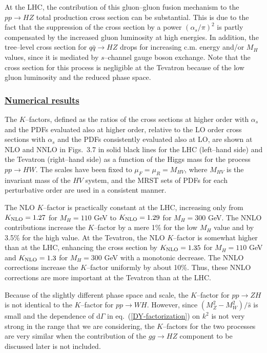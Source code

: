 At the LHC, the contribution of this  gluon--gluon fusion mechanism to the $pp
\to HZ$ total production cross section can be substantial. This is due to the
fact that the suppression of the cross section  by a power $(\alpha_s/\pi)^2$
is partly compensated by the increased gluon luminosity  at high energies. In
addition, the tree--level cross section for $q\bar{q} \to HZ$  drops for
increasing c.m. energy and/or $M_H$ values, since it is mediated by
$s$--channel gauge boson exchange. Note that the cross section for this process 
is negligible at the Tevatron because of the low gluon luminosity and the 
reduced phase space. 

\subsubsection*{\underline{Numerical results}}

The $K$--factors, defined as the ratios of the cross sections at higher order
with $\alpha_s$ and the PDFs evaluated also at higher order, relative to the LO
order cross sections with  $\alpha_s$ and the PDFs consistently evaluated also
at LO,  are shown at NLO and NNLO in Figs.~3.7 in solid black lines for 
the LHC (left--hand side) and the Tevatron (right--hand side) as a function of 
the Higgs  mass for the process $pp \to HW$.  The scales have been fixed to
$\mu_F=\mu_R=M_{HV}$, where $M_{HV}$ is the invariant mass of the $HV$ system,  
and the MRST sets of PDFs for each perturbative order are used in a consistent 
manner. \s

The NLO $K$--factor is practically constant at the LHC, increasing only from
$K_{\rm NLO}=1.27$ for $M_H=110$ GeV to $K_{\rm NLO}=1.29$ for $M_H=300$ GeV.
The NNLO contributions increase the $K$--factor by a mere 1\% for the low $M_H$
value and by 3.5\% for the high value. At the Tevatron, the NLO $K$--factor is 
somewhat higher than at the LHC, enhancing the cross section by  $K_{\rm
NLO}=1.35$ for $M_H=110$ GeV and $K_{\rm NLO}=1.3$ for $M_H=300$ GeV with a
monotonic decrease.  The NNLO corrections increase the $K$--factor uniformly by
about 10\%. Thus, these NNLO corrections are more important at the Tevatron
than at the LHC. \s

Because of the slightly different phase space and scale, the $K$--factor for $pp
\to ZH$ is not identical to the $K$--factor for $pp \to WH$. However, since
$(M_Z^2-M_W^2)/\hat{s}$ is small and the dependence  of d$\Gamma$ in
eq.~(\ref{DY-factorization}) on $k^2$ is not very strong in the range that we
are considering, the $K$--factors for the two processes are very  similar when
the contribution of the $gg \to HZ$ component to be discussed later is not
included. \s

